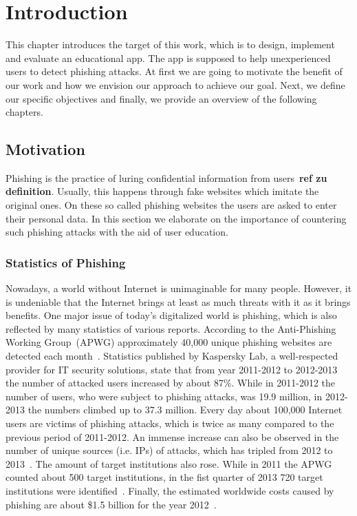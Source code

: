 \section{Introduction}
\label{s:introduction}
This chapter introduces the target of this work, which is to design, implement and evaluate an educational app. The app is supposed to help unexperienced users to detect phishing attacks. At first we are going to motivate the benefit of our work and how we envision our approach to achieve our goal. Next, we define our specific objectives and finally, we provide an overview of the following chapters.

\subsection{Motivation}
Phishing is the practice of luring confidential information from users~\textbf{ref zu definition}. Usually, this happens through fake websites which imitate the original ones. On these so called phishing websites the users are asked to enter their personal data. In this section we elaborate on the importance of countering such phishing attacks with the aid of user education. 

\subsubsection{Statistics of Phishing}
Nowadays, a world without Internet is unimaginable for many people. However, it is undeniable that the Internet brings at least as much threats with it as it brings benefits. One major issue of today's digitalized world is phishing, which is also reflected by many statistics of various reports. According to the Anti-Phishing Working Group~(APWG) approximately 40,000 unique phishing websites are detected each month~\cite{antiphishingtrendreport2013}. Statistics published by Kaspersky Lab, a well-respected provider for IT security solutions, state that from year 2011-2012 to 2012-2013 the number of attacked users increased by about 87\%. While in 2011-2012 the number of users, who were subject to phishing attacks, was 19.9 million, in 2012-2013 the numbers climbed up to 37.3 million. Every day about 100,000 Internet users are victims of phishing attacks, which is twice as many compared to the previous period of 2011-2012. An immense increase can also be observed in the number of unique sources (i.e. IPs) of attacks, which has tripled from 2012 to 2013~\cite{kasperskyreport2013}. The amount of target institutions also rose. While in 2011 the APWG counted about 500 target institutions, in the fist quarter of 2013 720 target institutions were identified~\cite{antiphishingglobalreport2013}. Finally, the estimated worldwide costs caused by phishing are about \$1.5 billion for the year 2012~\cite{rsa2013}.


